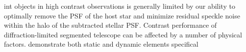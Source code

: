int objects in high contrast observations is generally limited by our ability to optimally remove the PSF of the host star and minimize residual speckle noise within the halo of the subtracted stellar PSF. Contrast performance of diffraction-limited segmented telescope can be affected by a number of physical factors. \cite{perr18} demonstrate both static and dynamic elements specifical